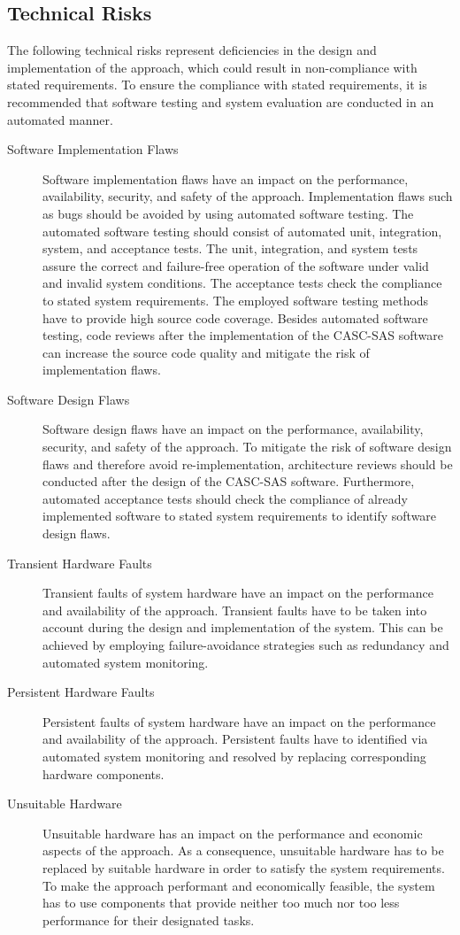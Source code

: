 \subsection{Technical Risks}
\label{sec:risk_assessment_technical}
The following technical risks represent deficiencies in the design and implementation of the approach, which could result in non-compliance with stated requirements.
To ensure the compliance with stated requirements, it is recommended that software testing and system evaluation are conducted in an automated manner.
\begin{description}
    \item[Software Implementation Flaws] Software implementation flaws have an impact on the performance, availability, security, and safety of the approach.
    Implementation flaws such as bugs should be avoided by using automated software testing.
    The automated software testing should consist of automated unit, integration, system, and acceptance tests.
    The unit, integration, and system tests assure the correct and failure-free operation of the software under valid and invalid system conditions.
    The acceptance tests check the compliance to stated system requirements.
    The employed software testing methods have to provide high source code coverage.
    Besides automated software testing, code reviews after the implementation of the CASC-SAS software can increase the source code quality and mitigate the risk of implementation flaws.
    \item[Software Design Flaws] Software design flaws have an impact on the performance, availability, security, and safety of the approach.
    To mitigate the risk of software design flaws and therefore avoid re-implementation, architecture reviews should be conducted after the design of the CASC-SAS software.
    Furthermore, automated acceptance tests should check the compliance of already implemented software to stated system requirements to identify software design flaws.
    \item[Transient Hardware Faults] Transient faults of system hardware have an impact on the performance and availability of the approach.
    Transient faults have to be taken into account during the design and implementation of the system.
    This can be achieved by employing failure-avoidance strategies such as redundancy and automated system monitoring.
    \item[Persistent Hardware Faults] Persistent faults of system hardware have an impact on the performance and availability of the approach.
    Persistent faults have to identified via automated system monitoring and resolved by replacing corresponding hardware components.
    \item[Unsuitable Hardware] Unsuitable hardware has an impact on the performance and economic aspects of the approach.
    As a consequence, unsuitable hardware has to be replaced by suitable hardware in order to satisfy the system requirements.
    To make the approach performant and economically feasible, the system has to use components that provide neither too much nor too less performance for their designated tasks.
\end{description}

